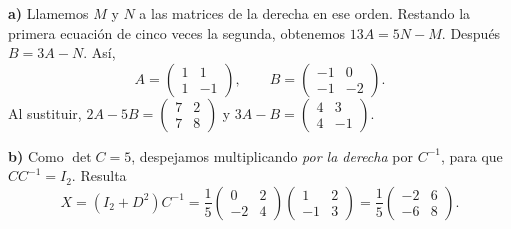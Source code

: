 \textbf{a)} Llamemos $M$ y $N$ a las matrices de la derecha en ese
orden. Restando la primera ecuación de cinco veces la segunda,
obtenemos $13A=5N-M$. Después $B=3A-N$. Así,
\[
\boxed{A=\begin{pmatrix}1&1\\1&-1\end{pmatrix}},\qquad
\boxed{B=\begin{pmatrix}-1&0\\-1&-2\end{pmatrix}}.
\]
Al sustituir, $2A-5B=\begin{pmatrix}7&2\\7&8\end{pmatrix}$ y
$3A-B=\begin{pmatrix}4&3\\4&-1\end{pmatrix}$.

\textbf{b)} Como $\det C=5$, despejamos multiplicando \emph{por la derecha}
por $C^{-1}$, para que $CC^{-1}=I_2$. Resulta
\[
X=(I_2+D^2)C^{-1}
=\frac15\begin{pmatrix}0&2\\-2&4\end{pmatrix}
\begin{pmatrix}1&2\\-1&3\end{pmatrix}
=\boxed{\frac15\begin{pmatrix}-2&6\\-6&8\end{pmatrix}}.
\]
